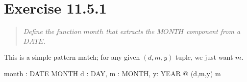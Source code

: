 \documentclass[10pt]{article}
\begin{document}
\section{Exercise 11.5.1}
\begin{quote}
  {\it Define the function $month$ that extracts the $MONTH$ component from a $DATE$.  }
\end{quote}

This is a simple pattern match; for any given $(d,m,y)$ tuple, we just want $m$.

\begin{axdef}
  month : DATE \fun MONTH 
  \where
  \forall d : DAY, m : MONTH, y: YEAR @ (d,m,y) \mapsto m
\end{axdef}
\end{document}
